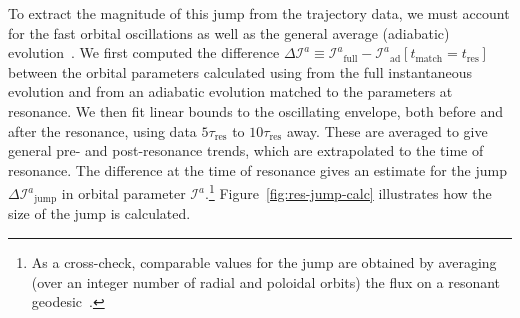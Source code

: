 \documentclass[aps,prd,amsfonts,amssymb,amsmath,nofootinbib,showpacs,superscriptaddress,twocolumn,floatfix]{revtex4-1}
\newcommand{\figref}[1]{Fig.~\ref{fig:#1}}
\newcommand{\Figref}[1]{Figure~\ref{fig:#1}}
\newcommand{\sub}[1]{\ensuremath{_\mathrm{#1}}}
\begin{document}
To extract the magnitude of this jump from the trajectory data, we must account for the fast orbital oscillations as well as the general average (adiabatic) evolution~\cite{ColeThesis2015}. We first computed the difference $\Delta \mathcal{I}^a \equiv \mathcal{I}^a\sub{full} - \mathcal{I}^a\sub{ad}[t\sub{match} = t\sub{res}]$ between the orbital parameters calculated using from the full instantaneous evolution and from an adiabatic evolution matched to the parameters at resonance. We then fit linear bounds to the oscillating envelope, both before and after the resonance, using data $5\tau\sub{res}$ to $10\tau\sub{res}$ away. These are averaged to give general pre- and post-resonance trends, which are extrapolated to the time of resonance. The difference at the time of resonance gives an estimate for the jump $\Delta \mathcal{I}^a\sub{jump}$ in orbital parameter $\mathcal{I}^a$.\footnote{As a cross-check, comparable values for the jump are obtained by averaging (over an integer number of radial and poloidal orbits) the flux on a resonant geodesic~\cite{ColeThesis2015}.} \Figref{res-jump-calc} illustrates how the size of the jump is calculated.


\end{document}
